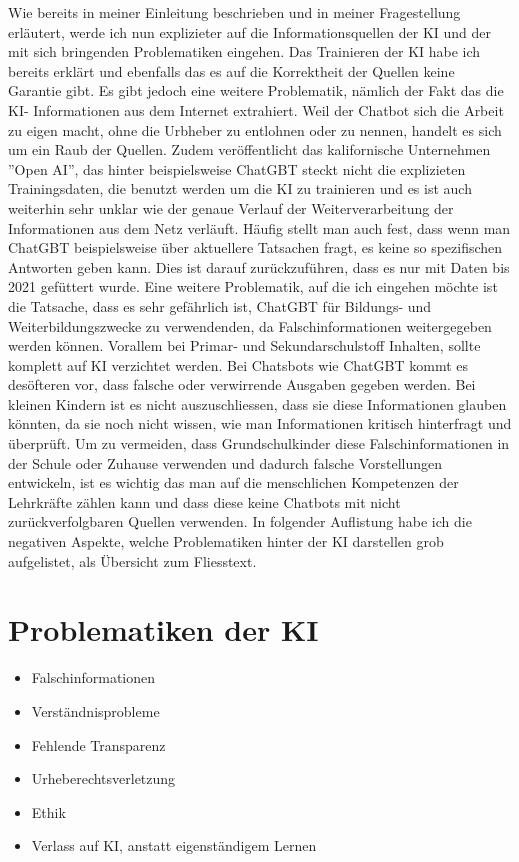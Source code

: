 \documentclass{report}
\begin{document}
Wie bereits in meiner Einleitung beschrieben und in meiner Fragestellung erläutert, werde ich nun explizieter auf die Informationsquellen der KI und der mit sich bringenden Problematiken eingehen. Das Trainieren der KI habe ich bereits erklärt und ebenfalls das es auf die Korrektheit der Quellen keine Garantie gibt. Es gibt jedoch eine weitere Problematik, nämlich der Fakt das die KI- Informationen aus dem Internet extrahiert. Weil der Chatbot sich die Arbeit zu eigen macht, ohne die Urbheber zu entlohnen oder zu nennen, handelt  es sich um ein Raub der Quellen. Zudem veröffentlicht das kalifornische Unternehmen ''Open AI'', das hinter beispielsweise ChatGBT steckt nicht die explizieten Trainingsdaten, die benutzt werden um die KI zu trainieren und es ist auch weiterhin sehr unklar wie der genaue Verlauf der Weiterverarbeitung der Informationen aus dem Netz verläuft. Häufig stellt man auch fest, dass wenn man ChatGBT beispielsweise über aktuellere Tatsachen fragt, es keine so spezifischen Antworten geben kann. Dies ist darauf zurückzuführen, dass es nur mit Daten bis 2021 gefüttert wurde. Eine weitere Problematik, auf die ich eingehen möchte ist die Tatsache, dass es sehr gefährlich ist, ChatGBT für Bildungs- und Weiterbildungszwecke zu verwendenden, da Falschinformationen weitergegeben werden können. Vorallem bei Primar- und Sekundarschulstoff Inhalten, sollte komplett auf KI verzichtet werden. 
Bei Chatsbots wie ChatGBT kommt es desöfteren vor, dass falsche oder verwirrende Ausgaben gegeben werden. Bei kleinen Kindern ist es nicht auszuschliessen, dass sie diese Informationen glauben könnten, da sie noch nicht wissen, wie man Informationen kritisch hinterfragt und überprüft. Um zu vermeiden, dass Grundschulkinder diese Falschinformationen in der Schule oder Zuhause verwenden und dadurch falsche Vorstellungen entwickeln, ist es wichtig das man auf die menschlichen Kompetenzen der Lehrkräfte zählen kann und dass diese keine Chatbots mit nicht zurückverfolgbaren Quellen verwenden. In folgender Auflistung habe ich die negativen Aspekte, welche Problematiken hinter der KI darstellen grob aufgelistet, als Übersicht zum Fliesstext.
\section{Problematiken der KI}

\begin{itemize}
 
    \item Falschinformationen
    \item Verständnisprobleme
    \item Fehlende Transparenz
    \item Urheberechtsverletzung
    \item Ethik
    \item  Verlass auf KI, anstatt eigenständigem Lernen
 
\end{itemize}
\end{document}
